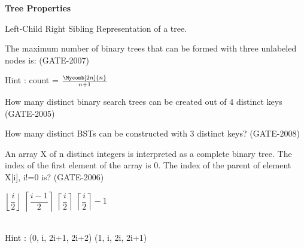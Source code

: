 
\centerline{\textbf{ \LARGE Tree Properties}}


\question  Left-Child Right Sibling Representation of a tree.

\begin{questyle}
  \question  The maximum number of binary trees that can be formed with three unlabeled nodes is:  (GATE-2007)

  \begin{oneparchoices}
      \qquad Hint : count = \Large{ \(  \frac {\Mycomb[2n]{n}}{n+1} \) }
  \end{oneparchoices}

\end{questyle}

\begin{questyle}
  \question  How many distinct binary search trees can be created out of 4 distinct keys  (GATE-2005)

  \begin{oneparchoices}
  \end{oneparchoices}
\end{questyle}

\begin{questyle}
  \question  How many distinct BSTs can be constructed with 3 distinct keys?  (GATE-2008)

  \begin{oneparchoices}
  \end{oneparchoices}
\end{questyle}


\begin{questyle}
  \question  An array X of n distinct integers is interpreted as a complete binary tree. The index
             of the first element of the array is 0. The index of the parent of element X[i], i!=0 is?  (GATE-2006)

  \begin{oneparchoices}
    \choice         \( \left \lfloor \dfrac i 2 \right \rfloor \)
    \choice         \( \left \lceil \dfrac{i-1}{2} \right \rceil \)
    \choice         \( \left \lceil \dfrac i 2 \right \rceil \)
    \CorrectChoice  \( \left \lceil \dfrac i 2 \right \rceil - 1 \)
  \end{oneparchoices}
    \vspace{0.08in}
    \\Hint : (0, i, 2i+1, 2i+2)      (1, i, 2i, 2i+1)
\end{questyle}



